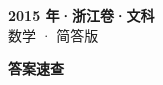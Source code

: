 \documentclass[zihao=-4, a4paper]{ctexart}
\begin{document}
\begin{center}
  {\Large\bfseries 2015 年·浙江卷·文科}\\[4pt]
  {\large 数学 · 简答版}
\end{center}
\medskip
{}

\clearpage
{}
\begin{center}{\Large\bfseries 答案速查}\end{center}
\medskip

\end{document}
